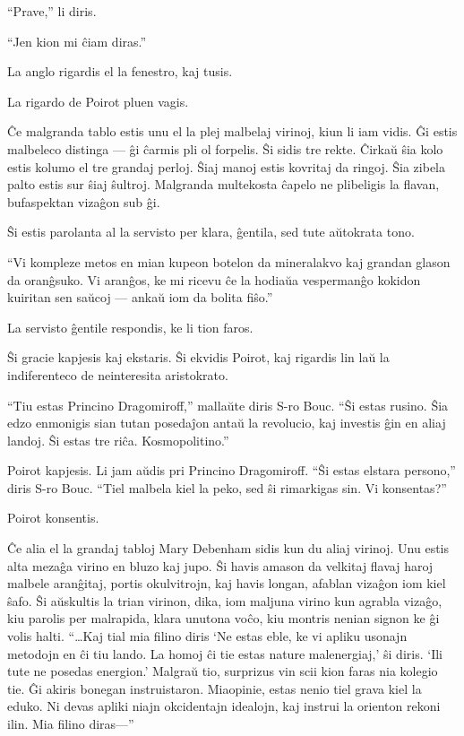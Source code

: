 ``Prave,'' li diris.

``Jen kion mi ĉiam diras.''

La anglo rigardis el la fenestro, kaj tusis.

La rigardo de Poirot pluen vagis.

Ĉe malgranda tablo estis unu el la plej malbelaj virinoj, kiun li iam vidis. Ĝi estis malbeleco distinga --- ĝi ĉarmis pli ol forpelis. Ŝi sidis tre rekte. Ĉirkaŭ ŝia kolo estis kolumo el tre grandaj perloj. Ŝiaj manoj estis kovritaj da ringoj. Ŝia zibela palto estis sur ŝiaj ŝultroj. Malgranda multekosta ĉapelo ne plibeligis la flavan, bufaspektan vizaĝon sub ĝi.

Ŝi estis parolanta al la servisto per klara, ĝentila, sed tute aŭtokrata tono.

``Vi kompleze metos en mian kupeon botelon da mineralakvo kaj grandan glason da oranĝsuko. Vi aranĝos, ke mi ricevu ĉe la hodiaŭa vespermanĝo kokidon kuiritan sen saŭcoj --- ankaŭ iom da bolita fiŝo.''

La servisto ĝentile respondis, ke li tion faros.

Ŝi gracie kapjesis kaj ekstaris. Ŝi ekvidis Poirot, kaj rigardis lin laŭ la indiferenteco de neinteresita aristokrato.

``Tiu estas Princino Dragomiroff,'' mallaŭte diris S-ro Bouc. ``Ŝi estas rusino. Ŝia edzo enmonigis sian tutan posedaĵon antaŭ la revolucio, kaj investis ĝin en aliaj landoj. Ŝi estas tre riĉa. Kosmopolitino.''

Poirot kapjesis. Li jam aŭdis pri Princino Dragomiroff. ``Ŝi estas elstara persono,'' diris S-ro Bouc. ``Tiel malbela kiel la peko, sed ŝi rimarkigas sin. Vi konsentas?''

Poirot konsentis.

Ĉe alia el la grandaj tabloj Mary Debenham sidis kun du aliaj virinoj. Unu estis alta mezaĝa virino en bluzo kaj jupo. Ŝi havis amason da velkitaj flavaj haroj malbele aranĝitaj, portis okulvitrojn, kaj havis longan, afablan vizaĝon iom kiel ŝafo. Ŝi aŭskultis la trian virinon, dika, iom maljuna virino kun agrabla vizaĝo, kiu parolis per malrapida, klara unutona voĉo, kiu montris nenian signon ke ĝi volis halti. ``{\ldots}Kaj tial mia filino diris `Ne estas eble, ke vi apliku usonajn metodojn en ĉi tiu lando. La homoj ĉi tie estas nature malenergiaj,' ŝi diris. `Ili tute ne posedas energion.' Malgraŭ tio, surprizus vin scii kion faras nia kolegio tie. Ĝi akiris bonegan instruistaron. Miaopinie, estas nenio tiel grava kiel la eduko. Ni devas apliki niajn okcidentajn idealojn, kaj instrui la orienton rekoni ilin. Mia filino diras---''

